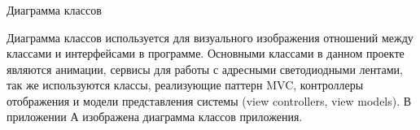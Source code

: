 \subsubsection{} Диаграмма классов
\label{sec:develop:umlDiagrams:class}

Диаграмма классов используется для визуального изображения отношений между классами и интерфейсами в программе. Основными классами в данном проекте являются анимации, сервисы для работы с адресными светодиодными лентами, так же используются классы, реализующие паттерн MVC, контроллеры отображения и модели представления системы (view controllers, view models). В приложении А изображена диаграмма классов приложения.
